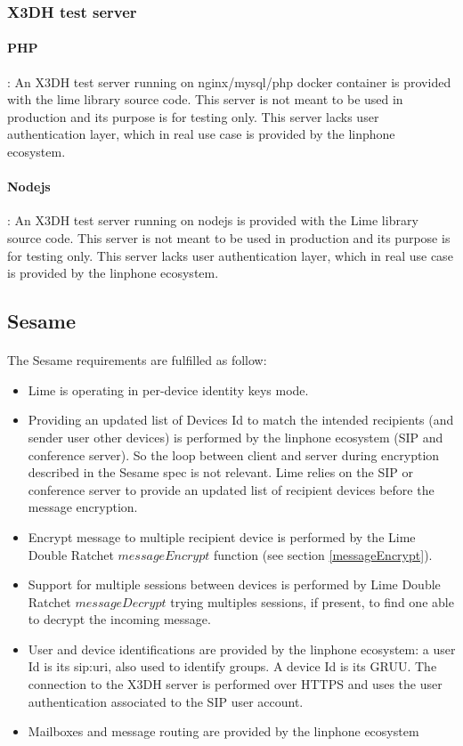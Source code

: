 \documentclass[a4paper,11pt]{article}
\begin{document}
    \subsubsection{X3DH test server}
      \paragraph*{PHP}: An X3DH test server running on nginx/mysql/php docker container is provided with the lime library source code. This server is not meant to be used in production and its purpose is for testing only. This server lacks user authentication layer, which in real use case is provided by the linphone ecosystem.
      \paragraph*{Nodejs}: An X3DH test server running on nodejs is provided with the Lime library source code. This server is not meant to be used in production and its purpose is for testing only. This server lacks user authentication layer, which in real use case is provided by the linphone ecosystem.
  \subsection{Sesame}
    \paragraph{}The Sesame requirements are fulfilled as follow:
    \begin{itemize}
      \item Lime is operating in per-device identity keys mode.
      \item Providing an updated list of Devices Id to match the intended recipients (and sender user other devices) is performed by the linphone ecosystem (SIP and conference server). So the loop between client and server during encryption described in the Sesame spec\cite{sesame} is not relevant. Lime relies on the SIP or conference server to provide an updated list of recipient devices before the message encryption.
      \item Encrypt message to multiple recipient device is performed by the Lime Double Ratchet $messageEncrypt$ function (see section \ref{messageEncrypt}).
      \item Support for multiple sessions between devices is performed by Lime Double Ratchet $messageDecrypt$ trying multiples sessions, if present, to find one able to decrypt the incoming message.
      \item User and device identifications are provided by the linphone ecosystem: a user Id is its sip:uri, also used to identify groups. A device Id is its GRUU\cite{rfc5627}. The connection to the X3DH server is performed over HTTPS and uses the user authentication associated to the SIP user account.
      \item Mailboxes and message routing are provided by the linphone ecosystem
    \end{itemize}
   
\end{document}

